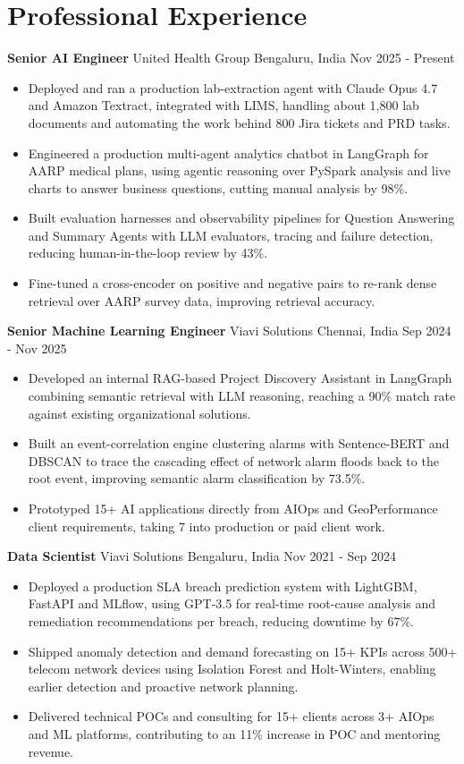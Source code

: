 \documentclass[10pt,a4paper]{article}
\newcommand{\role}[4]{\textbf{#1} \textbar{} #2 \hfill #3 \textbar{} #4\par}
\begin{document}
\section{Professional Experience}
\role{Senior AI Engineer}{United Health Group}{Bengaluru, India}{Nov 2025 - Present}
\begin{itemize}
  \item Deployed and ran a production lab-extraction agent with Claude Opus 4.7 and Amazon Textract, integrated with LIMS, handling about 1,800 lab documents and automating the work behind 800 Jira tickets and PRD tasks.
  \item Engineered a production multi-agent analytics chatbot in LangGraph for AARP medical plans, using agentic reasoning over PySpark analysis and live charts to answer business questions, cutting manual analysis by 98\%.
  \item Built evaluation harnesses and observability pipelines for Question Answering and Summary Agents with LLM evaluators, tracing and failure detection, reducing human-in-the-loop review by 43\%.
  \item Fine-tuned a cross-encoder on positive and negative pairs to re-rank dense retrieval over AARP survey data, improving retrieval accuracy.
\end{itemize}
\vspace{3pt}
\role{Senior Machine Learning Engineer}{Viavi Solutions}{Chennai, India}{Sep 2024 - Nov 2025}
\begin{itemize}
  \item Developed an internal RAG-based Project Discovery Assistant in LangGraph combining semantic retrieval with LLM reasoning, reaching a 90\% match rate against existing organizational solutions.
  \item Built an event-correlation engine clustering alarms with Sentence-BERT and DBSCAN to trace the cascading effect of network alarm floods back to the root event, improving semantic alarm classification by 73.5\%.
  \item Prototyped 15+ AI applications directly from AIOps and GeoPerformance client requirements, taking 7 into production or paid client work.
\end{itemize}
\vspace{3pt}
\role{Data Scientist}{Viavi Solutions}{Bengaluru, India}{Nov 2021 - Sep 2024}
\begin{itemize}
  \item Deployed a production SLA breach prediction system with LightGBM, FastAPI and MLflow, using GPT-3.5 for real-time root-cause analysis and remediation recommendations per breach, reducing downtime by 67\%.
  \item Shipped anomaly detection and demand forecasting on 15+ KPIs across 500+ telecom network devices using Isolation Forest and Holt-Winters, enabling earlier detection and proactive network planning.
  \item Delivered technical POCs and consulting for 15+ clients across 3+ AIOps and ML platforms, contributing to an 11\% increase in POC and mentoring revenue.
\end{itemize}
\end{document}
